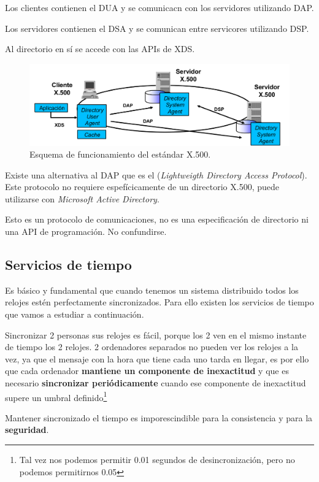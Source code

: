 Los clientes contienen el DUA y se comunicacn con los servidores utilizando DAP.

Los servidores contienen el DSA y se comunican entre servicores utilizando DSP.

Al directorio en sí se accede con las APIs de XDS.


\begin{figure}[hbtp]
\centering
\includegraphics[width=1\textwidth]{img/X500.png}
\caption{Esquema de funcionamiento del estándar X.500.}
\label{X500}
\end{figure}

Existe una alternativa al DAP que es el  (\textit{Lightweigth Directory Access Protocol}). Este protocolo no requiere espefícicamente de un directorio X.500, puede utilizarse con \textit{Microsoft Active Directory}.

Esto es un protocolo de comunicaciones, no es una especificación de directorio ni una API de programación. No confundirse.


\subsection{Servicios de tiempo}

Es básico y fundamental que cuando tenemos un sistema distribuido todos los relojes estén perfectamente sincronizados. Para ello existen los servicios de tiempo que vamos a estudiar a continuación.

Sincronizar 2 personas sus relojes es fácil, porque los 2 ven en el mismo instante de tiempo los 2 relojes. 2 ordenadores separados no pueden ver los relojes a la vez, ya que el mensaje con la hora que tiene cada uno tarda en llegar, es por ello que cada ordenador \textbf{mantiene un componente de inexactitud} y que es necesario \textbf{sincronizar periódicamente} cuando ese componente de inexactitud supere un umbral definido\footnote{Tal vez nos podemos permitir 0.01 segundos de desincronización, pero no podemos permitirnos 0.05}

Mantener sincronizado el tiempo es imporescindible para la consistencia y para la \textbf{seguridad}.

